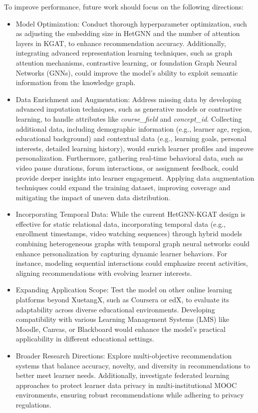 \documentclass{ieeeaccess}
\begin{document}
To improve performance, future work should focus on the following directions:
\begin{itemize} 
\item Model Optimization: Conduct thorough hyperparameter optimization, such as adjusting the embedding size in HetGNN and the number of attention layers in KGAT, to enhance recommendation accuracy. Additionally, integrating advanced representation learning techniques, such as graph attention mechanisms, contrastive learning, or foundation Graph Neural Networks (GNNs), could improve the model’s ability to exploit semantic information from the knowledge graph.

\item Data Enrichment and Augmentation: Address missing data by developing advanced imputation techniques, such as generative models or contrastive learning, to handle attributes like \textit{course\_field} and \textit{concept\_id}. Collecting additional data, including demographic information (e.g., learner age, region, educational background) and contextual data (e.g., learning goals, personal interests, detailed learning history), would enrich learner profiles and improve personalization. Furthermore, gathering real-time behavioral data, such as video pause durations, forum interactions, or assignment feedback, could provide deeper insights into learner engagement. Applying data augmentation techniques could expand the training dataset, improving coverage and mitigating the impact of uneven data distribution.

\item Incorporating Temporal Data: While the current HetGNN-KGAT design is effective for static relational data, incorporating temporal data (e.g., enrollment timestamps, video watching sequences) through hybrid models combining heterogeneous graphs with temporal graph neural networks could enhance personalization by capturing dynamic learner behaviors. For instance, modeling sequential interactions could emphasize recent activities, aligning recommendations with evolving learner interests.

\item Expanding Application Scope: Test the model on other online learning platforms beyond XuetangX, such as Coursera or edX, to evaluate its adaptability across diverse educational environments. Developing compatibility with various Learning Management Systems (LMS) like Moodle, Canvas, or Blackboard would enhance the model’s practical applicability in different educational settings.

\item Broader Research Directions: Explore multi-objective recommendation systems that balance accuracy, novelty, and diversity in recommendations to better meet learner needs. Additionally, investigate federated learning approaches to protect learner data privacy in multi-institutional MOOC environments, ensuring robust recommendations while adhering to privacy regulations.
\end{itemize}
\end{document}
